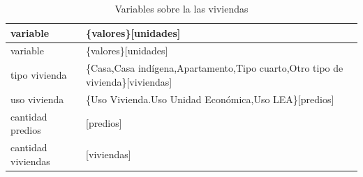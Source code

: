 \documentclass[12pt,a4paper,openany]{book}
\theoremstyle{definition}
\theoremstyle{definition}
\theoremstyle{definition}
\theoremstyle{remark}
\begin{document}
\begin{longtable}[]{@{}ll@{}}
\caption{\label{tab:vars-vivienda} Variables sobre la las
viviendas}\tabularnewline
\toprule
\begin{minipage}[b]{0.24\columnwidth}\raggedright\strut
variable\strut
\end{minipage} & \begin{minipage}[b]{0.37\columnwidth}\raggedright\strut
\{valores\}{[}unidades{]}\strut
\end{minipage}\tabularnewline
\midrule
\endfirsthead
\toprule
\begin{minipage}[b]{0.24\columnwidth}\raggedright\strut
variable\strut
\end{minipage} & \begin{minipage}[b]{0.37\columnwidth}\raggedright\strut
\{valores\}{[}unidades{]}\strut
\end{minipage}\tabularnewline
\midrule
\endhead
\begin{minipage}[t]{0.24\columnwidth}\raggedright\strut
tipo vivienda\strut
\end{minipage} & \begin{minipage}[t]{0.37\columnwidth}\raggedright\strut
\{Casa,Casa indígena,Apartamento,Tipo cuarto,Otro tipo de
vivienda\}{[}viviendas{]}\strut
\end{minipage}\tabularnewline
\begin{minipage}[t]{0.24\columnwidth}\raggedright\strut
uso vivienda\strut
\end{minipage} & \begin{minipage}[t]{0.37\columnwidth}\raggedright\strut
\{Uso Vivienda.Uso Unidad Económica,Uso LEA\}{[}predios{]}\strut
\end{minipage}\tabularnewline
\begin{minipage}[t]{0.24\columnwidth}\raggedright\strut
cantidad predios\strut
\end{minipage} & \begin{minipage}[t]{0.37\columnwidth}\raggedright\strut
{[}predios{]}\strut
\end{minipage}\tabularnewline
\begin{minipage}[t]{0.24\columnwidth}\raggedright\strut
cantidad viviendas\strut
\end{minipage} & \begin{minipage}[t]{0.37\columnwidth}\raggedright\strut
{[}viviendas{]}\strut
\end{minipage}\tabularnewline
\bottomrule
\end{longtable}
\end{document}
